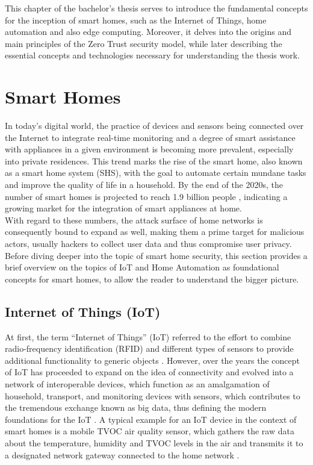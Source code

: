 This chapter of the bachelor's thesis serves to introduce the fundamental concepts for the inception of smart homes, such as the Internet of Things, home automation and also edge computing. Moreover, it delves into the origins and main principles of the Zero Trust security model, while later describing the essential concepts and technologies necessary for understanding the thesis work.

\section{Smart Homes}
In today's digital world, the practice of devices and sensors being connected over the Internet to integrate real-time monitoring and a degree of smart assistance with appliances in a given environment is becoming more prevalent, especially into private residences. This trend marks the rise of the smart home, also known as a smart home system (SHS), with the goal to automate certain mundane tasks and improve the quality of life in a household. By the end of the 2020s, the number of smart homes is projected to reach 1.9 billion people \cite{smarthome_report}, indicating a growing market for the integration of smart appliances at home.\\
With regard to these numbers, the attack surface of home networks is consequently bound to expand as well, making them a prime target for malicious actors, usually hackers to collect user data and thus compromise user privacy. Before diving deeper into the topic of smart home security, this section provides a brief overview on the topics of IoT and Home Automation as foundational concepts for smart homes, to allow the reader to understand the bigger picture.

\subsection{Internet of Things (IoT)}
At first, the term “Internet of Things” (IoT) referred to the effort to combine radio-frequency identification (RFID) and different types of sensors to provide additional functionality to generic objects \cite{ng_internet--things_2017}. However, over the years the concept of IoT has proceeded to expand on the idea of connectivity and evolved into a network of interoperable devices, which function as an amalgamation of household, transport, and monitoring devices with sensors, which contributes to the tremendous exchange known as big data, thus defining the modern foundations for the IoT \cite{khedekar_home_2017}. A typical example for an IoT device in the context of smart homes is a mobile TVOC \cite{understanding_tvoc} air quality sensor, which gathers the raw data about the temperature, humidity and TVOC levels in the air and transmits it to a designated network gateway connected to the home network \cite{aqara_monitor}.

